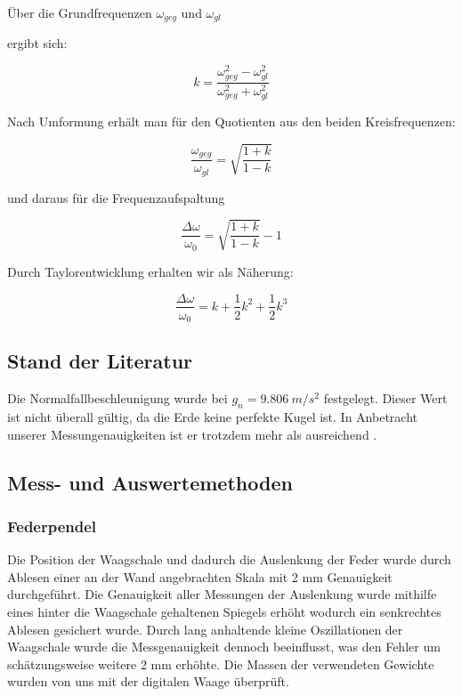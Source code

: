 Über die Grundfrequenzen $ \omega_{geg} $ und $ \omega_{gl} $

ergibt sich:

\begin{equation}
\label{eq1.12}
k=\frac{ \omega_{geg}^2-\omega_{gl}^2}{ \omega_{geg}^2+\omega_{gl}^2}
\end{equation}

Nach Umformung erhält man für den Quotienten aus den beiden Kreisfrequenzen:

\begin{equation}
\label{eq1.13}
\frac{\omega_{geg}}{\omega_{gl}}= \sqrt{\frac{1+k}{1-k}}
\end{equation}

und daraus für die Frequenzaufspaltung

\begin{equation}
\label{eq1.14}
\frac{\Delta\omega}{\omega_0}=\sqrt{\frac{1+k}{1-k}}-1
\end{equation}

Durch Taylorentwicklung erhalten wir als Näherung:

\begin{equation}
\label{eq1.15}
\frac{\Delta\omega}{\omega_0}=k+\frac{1}{2}k^2+\frac{1}{2}k^3
\end{equation}


\subsection{Stand der Literatur}

Die Normalfallbeschleunigung wurde bei  $ g_n= \SI{9,806}{m/s^2}$ festgelegt. Dieser Wert ist nicht überall gültig, da die Erde keine perfekte Kugel ist. In Anbetracht unserer Messungenauigkeiten ist er trotzdem mehr als ausreichend .
\subsection{Mess- und Auswertemethoden}
\subsubsection{Federpendel}
Die Position der Waagschale und dadurch die Auslenkung der Feder wurde durch Ablesen einer an der Wand angebrachten Skala mit 2 mm Genauigkeit durchgeführt. Die Genauigkeit aller Messungen der Auslenkung wurde mithilfe eines hinter die Waagschale gehaltenen Spiegels erhöht wodurch ein senkrechtes Ablesen gesichert wurde. Durch lang anhaltende kleine Oszillationen der Waagschale wurde die Messgenauigkeit dennoch beeinflusst, was den Fehler um schätzungsweise weitere 2 mm erhöhte. Die Massen der verwendeten Gewichte wurden von uns mit der digitalen Waage überprüft.
